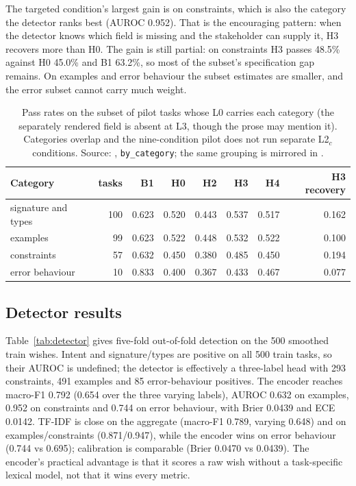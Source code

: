 \documentclass{article}
\begin{document}
The targeted condition's largest gain is on constraints, which is also the category the
detector ranks best (AUROC 0.952). That is the encouraging pattern: when the detector knows
which field is missing and the stakeholder can supply it, H3 recovers more than H0. The gain
is still partial: on constraints H3 passes 48.5\% against H0 45.0\% and B1 63.2\%, so most of
the subset's specification gap remains. On examples and error behaviour the subset estimates
are smaller, and the error subset cannot carry much weight.

\begin{table}[!ht]
  \centering
  \small
  \begin{tabular}{@{}lrrrrrrr@{}}
    \toprule
    Category & tasks & B1 & H0 & H2 & H3 & H4 & H3 recovery \\
    \midrule
    signature and types & 100 & 0.623 & 0.520 & 0.443 & 0.537 & 0.517 & 0.162 \\
    examples & 99 & 0.623 & 0.522 & 0.448 & 0.532 & 0.522 & 0.100 \\
    constraints & 57 & 0.632 & 0.450 & 0.380 & 0.485 & 0.450 & 0.194 \\
    error behaviour & 10 & 0.833 & 0.400 & 0.367 & 0.433 & 0.467 & 0.077 \\
    \bottomrule
  \end{tabular}
  \caption{Pass rates on the subset of pilot tasks whose L0 carries each category (the
  separately rendered field is absent at L3, though the prose may mention it). Categories
  overlap and the nine-condition pilot does not run separate L2$_c$ conditions. Source:
  \protect{}, \texttt{by\_category}; the same
  grouping is mirrored in \protect{}.}
  \label{tab:categories}
\end{table}

\subsection{Detector results}

Table~\ref{tab:detector} gives five-fold out-of-fold detection on the 500 smoothed train
wishes. Intent and signature/types are positive on all 500 train tasks, so their AUROC is
undefined; the detector is effectively a three-label head with 293 constraints, 491 examples
and 85 error-behaviour positives. The encoder reaches macro-F1 0.792 (0.654 over the three
varying labels), AUROC 0.632 on examples, 0.952 on constraints and 0.744 on error behaviour,
with Brier 0.0439 and ECE 0.0142. TF-IDF is close on the aggregate (macro-F1 0.789, varying
0.648) and on examples/constraints (0.871/0.947), while the encoder wins on error behaviour
(0.744 vs 0.695); calibration is comparable (Brier 0.0470 vs 0.0439). The encoder's practical
advantage is that it scores a raw wish without a task-specific lexical model, not that it wins
every metric.
\end{document}
